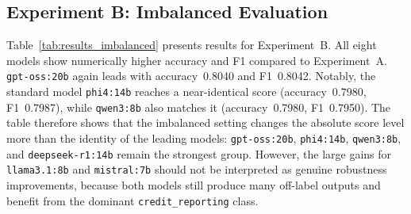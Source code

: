 \documentclass[journal]{IEEEtran}
\begin{document}
\subsection{Experiment B: Imbalanced Evaluation}

Table~\ref{tab:results_imbalanced} presents results for Experiment~B.
All eight models show numerically higher accuracy and F1 compared to
Experiment~A. \texttt{gpt-oss:20b} again leads with accuracy~0.8040
and F1~0.8042. Notably, the standard model \texttt{phi4:14b} reaches
a near-identical score (accuracy~0.7980, F1~0.7987), while
\texttt{qwen3:8b} also matches it (accuracy~0.7980, F1~0.7950).
The table therefore shows that the imbalanced setting changes the
absolute score level more than the identity of the leading models:
\texttt{gpt-oss:20b}, \texttt{phi4:14b}, \texttt{qwen3:8b}, and
\texttt{deepseek-r1:14b} remain the strongest group. However, the
large gains for \texttt{llama3.1:8b} and \texttt{mistral:7b} should
not be interpreted as genuine robustness improvements, because both
models still produce many off-label outputs and benefit from the
dominant \texttt{credit\_reporting} class.

\begin{table}[!t]
  \renewcommand{\arraystretch}{1.3}
  \caption{Experiment B Results — Imbalanced ($N = 1{,}000$)}
  \label{tab:results_imbalanced}
  \centering
  \scriptsize
  \setlength{\tabcolsep}{2pt}
\end{table}
\end{document}
